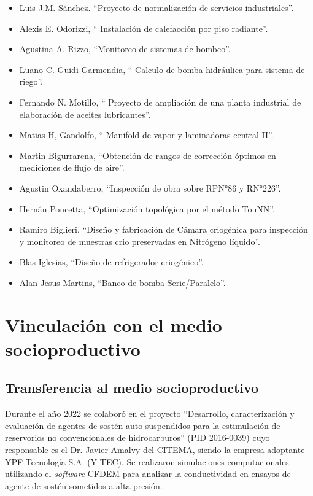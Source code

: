 \documentclass[a4paper,11pt,twoside,final,titlepage,onecolumn,openright]{report}
\begin{document}
\begin{itemize}
    \item Luis J.M. Sánchez. ``Proyecto de normalización de servicios industriales''.
    \item Alexis E. Odorizzi, `` Instalación de calefacción por piso radiante''.
    \item Agustina A. Rizzo, ``Monitoreo de sistemas de bombeo''.
    \item Luano C. Guidi Garmendia, `` Calculo de bomba hidráulica para sistema de riego''.
    \item Fernando N. Motillo, `` Proyecto de ampliación de una planta industrial de elaboración de aceites lubricantes''.
    \item Matias H, Gandolfo, `` Manifold de vapor y laminadoras central II''.
    \item Martin Bigurrarena, ``Obtención de rangos de corrección óptimos en mediciones de flujo de aire''.
    \item Agustin Oxandaberro, ``Inspección de obra sobre RPN°86 y RN°226''.
    \item Hernán Poncetta, ``Optimización topológica por el método TouNN''.
    \item Ramiro Biglieri, ``Diseño y fabricación de Cámara criogénica para inspección y monitoreo de muestras crio preservadas en Nitrógeno líquido''.
    \item Blas Iglesias, ``Diseño de refrigerador criogénico''.
    \item Alan Jesus Martins, ``Banco de bomba Serie/Paralelo''.
\end{itemize}



\chapter{Vinculación con el medio socioproductivo}

\section{Transferencia al medio socioproductivo}

Durante el año 2022 se colaboró en el proyecto ``Desarrollo, caracterización y evaluación de agentes de sostén auto-suspendidos para la estimulación de reservorios no convencionales de hidrocarburos'' (PID 2016-0039) cuyo responsable es el Dr. Javier Amalvy del CITEMA, siendo la empresa adoptante YPF Tecnología S.A. (Y-TEC). Se realizaron simulaciones computacionales utilizando el \textit{software} CFDEM para analizar la conductividad en ensayos de agente de sostén sometidos a alta presión.
\end{document}

